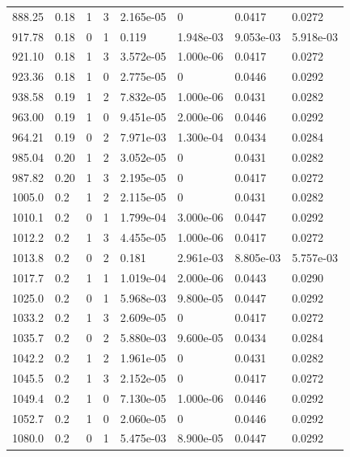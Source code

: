 \documentclass[preview]{standalone}
\begin{document}
{{{\begin{tabular}{L{1.2cm}C{1.2cm} C{0.3cm}C{0.5cm} C{1.4cm}C{1.4cm} C{1.4cm}C{1.4cm}}
  888.25  &  0.18  & 1     &  3 &  2.165e-05  & 0  & 0.0417 &  0.0272   \\ 
  917.78  &  0.18  & 0     &  1 &  0.119  & 1.948e-03  & 9.053e-03 &  5.918e-03   \\ 
  921.10  &  0.18  & 1     &  3 &  3.572e-05  & 1.000e-06  & 0.0417 &  0.0272   \\ 
  923.36  &  0.18  & 1     &  0 &  2.775e-05  & 0  & 0.0446 &  0.0292   \\ 
  938.58  &  0.19  & 1     &  2 &  7.832e-05  & 1.000e-06  & 0.0431 &  0.0282   \\ 
  963.00  &  0.19  & 1     &  0 &  9.451e-05  & 2.000e-06  & 0.0446 &  0.0292   \\ 
  964.21  &  0.19  & 0     &  2 &  7.971e-03  & 1.300e-04  & 0.0434 &  0.0284   \\ 
  985.04  &  0.20  & 1     &  2 &  3.052e-05  & 0  & 0.0431 &  0.0282   \\ 
  987.82  &  0.20  & 1     &  3 &  2.195e-05  & 0  & 0.0417 &  0.0272   \\ 
  1005.0  &   0.2  & 1     &  2 &  2.115e-05  & 0  & 0.0431 &  0.0282   \\ 
  1010.1  &   0.2  & 0     &  1 &  1.799e-04  & 3.000e-06  & 0.0447 &  0.0292   \\ 
  1012.2  &   0.2  & 1     &  3 &  4.455e-05  & 1.000e-06  & 0.0417 &  0.0272   \\ 
  1013.8  &   0.2  & 0     &  2 &  0.181  & 2.961e-03  & 8.805e-03 &  5.757e-03   \\ 
  1017.7  &   0.2  & 1     &  1 &  1.019e-04  & 2.000e-06  & 0.0443 &  0.0290   \\ 
  1025.0  &   0.2  & 0     &  1 &  5.968e-03  & 9.800e-05  & 0.0447 &  0.0292   \\ 
  1033.2  &   0.2  & 1     &  3 &  2.609e-05  & 0  & 0.0417 &  0.0272   \\ 
  1035.7  &   0.2  & 0     &  2 &  5.880e-03  & 9.600e-05  & 0.0434 &  0.0284   \\ 
  1042.2  &   0.2  & 1     &  2 &  1.961e-05  & 0  & 0.0431 &  0.0282   \\ 
  1045.5  &   0.2  & 1     &  3 &  2.152e-05  & 0  & 0.0417 &  0.0272   \\ 
  1049.4  &   0.2  & 1     &  0 &  7.130e-05  & 1.000e-06  & 0.0446 &  0.0292   \\ 
  1052.7  &   0.2  & 1     &  0 &  2.060e-05  & 0  & 0.0446 &  0.0292   \\ 
  1080.0  &   0.2  & 0     &  1 &  5.475e-03  & 8.900e-05  & 0.0447 &  0.0292   \\ 

\end{tabular}}}}
\end{document}
